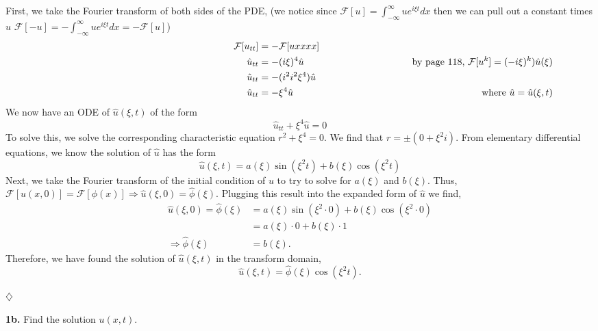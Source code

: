 \documentclass{article}
\begin{document}
First, we take the Fourier transform of both sides of the PDE, (we notice since \(\mathcal{F}[u]= \int_{-\infty}^{\infty} u e^{i\xi t} dx \) then we can pull out a constant times \(u\)  \(\mathcal{F}[-u]= -\int_{-\infty}^{\infty} u e^{i\xi t} dx  = -\mathcal{F}[u]\))
\begin{align*}
&&  \mathcal{F}[ u_{tt}] &= -\mathcal{F}[u{xxxx}]    & \text{ }& \\
\hspace{65mm} && \hat u_{tt} &=  -(i\xi)^4 \hat u		& \text{by page 118, } \mathcal{F}[u^k]=(-i\xi)^k)\hat u(\xi)& \\
 &&  \hat u_{tt} &=  -( i^2 i^2 \xi^4) \hat u &&\\
 && \hat u_{tt} &= -\xi^4 \hat u &\hspace{55mm} \text{ where } \hat u = \hat u(\xi, t) &
\end{align*}
We now have an ODE of \(\hat u(\xi,t) \) of the form 
\[
\hat u_{tt} + \xi^4\hat u = 0 
\]
To solve this, we solve the corresponding characteristic equation \( r^2+\xi^4 = 0\). We find that \(r= \pm (0 + \xi^2i) \). From elementary differential equations, we know the solution of \(\hat u \) has the form 
\[
\hat u(\xi,t) = a(\xi) \sin(\xi^2 t) + b(\xi) \cos(\xi^2 t) 
\]
Next, we take the Fourier transform of the initial condition of \(u\) to try to solve for \(a(\xi)\) and \(b(\xi)\). Thus, \( \mathcal{F} [u(x,0)] = \mathcal{F}[\phi(x)] \Rightarrow \hat u(\xi,0)=\hat \phi(\xi)\). Plugging this result into the expanded form of \(\hat u\) we find,
\begin{align*}
\hat u(\xi,0)=\hat \phi(\xi) &= a(\xi) \sin(\xi^2 \cdot 0) + b(\xi) \cos(\xi^2 \cdot 0) \\
&= a(\xi)\cdot0 + b(\xi) \cdot 1 \\
\Rightarrow  \hat \phi(\xi) &= b(\xi) .
\end{align*}
Therefore, we have found the solution of \(\hat u(\xi,t)\) in the transform domain, 
\[
\hat u(\xi,t) = \hat \phi(\xi)\cos(\xi^2 t). 
\]

\begin{flushright}
\( \diamondsuit \)
\end{flushright}










\vspace{3mm}
\textbf{1b.} Find the solution \(u(x,t)\). 
\end{document}
